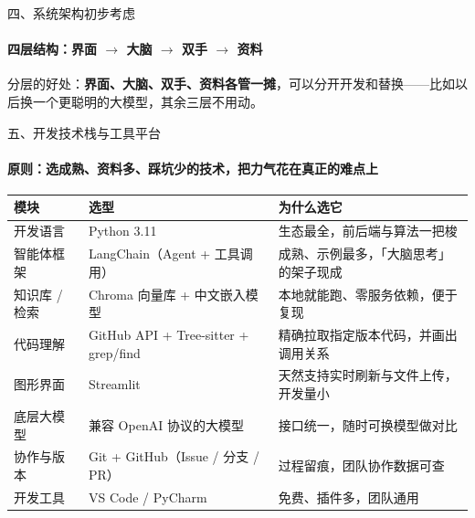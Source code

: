 \documentclass{beamer}
\begin{document}
\begin{frame}{四、系统架构初步考虑}
\framesubtitle{四层结构：界面 $\rightarrow$ 大脑 $\rightarrow$ 双手 $\rightarrow$ 资料}
\centering
{}
\vspace{0.4em}

{\footnotesize 分层的好处：\textbf{界面、大脑、双手、资料各管一摊}，可以分开开发和替换——比如以后换一个更聪明的大模型，其余三层不用动。}
\end{frame}

\begin{frame}{五、开发技术栈与工具平台}
\framesubtitle{原则：选成熟、资料多、踩坑少的技术，把力气花在真正的难点上}
\centering
\footnotesize
\renewcommand{\arraystretch}{1.15}
\begin{tabular}{@{}p{}p{}p{}@{}}
\toprule
\textbf{模块} & \textbf{选型} & \textbf{为什么选它} \\
\midrule
开发语言 & Python 3.11 & 生态最全，前后端与算法一把梭 \\
智能体框架 & LangChain（Agent + 工具调用） & 成熟、示例最多，「大脑思考」的架子现成 \\
知识库 / 检索 & Chroma 向量库 + 中文嵌入模型 & 本地就能跑、零服务依赖，便于复现 \\
代码理解 & GitHub API + Tree-sitter + grep/find & 精确拉取指定版本代码，并画出调用关系 \\
图形界面 & Streamlit & 天然支持实时刷新与文件上传，开发量小 \\
底层大模型 & 兼容 OpenAI 协议的大模型 & 接口统一，随时可换模型做对比 \\
协作与版本 & Git + GitHub（Issue / 分支 / PR） & 过程留痕，团队协作数据可查 \\
开发工具 & VS Code / PyCharm & 免费、插件多，团队通用 \\
\bottomrule
\end{tabular}
\end{frame}
\end{document}

